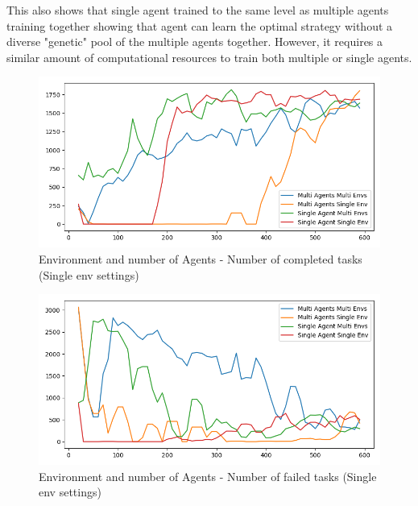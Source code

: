 This also shows that single agent trained to the same level as multiple agents training together showing that agent can
learn the optimal strategy without a diverse "genetic" pool of the multiple agents together. However, it requires a
similar amount of computational resources to train both multiple or single agents.

\begin{figure}[H]
    \centering
    \includegraphics[width=\linewidth]{figures/5_evaluation_figs/env_agent_num_training_fig/single_env_num_completed_tasks.png}
    \caption{Environment and number of Agents - Number of completed tasks (Single env settings)}
    \label{fig:single-env-num-completed-tasks}
\end{figure}

\begin{figure}[H]
    \centering
    \includegraphics[width=\linewidth]{figures/5_evaluation_figs/env_agent_num_training_fig/single_env_num_failed_tasks.png}
    \caption{Environment and number of Agents - Number of failed tasks (Single env settings)}
    \label{fig:single-env-num-failed-tasks}
\end{figure}

